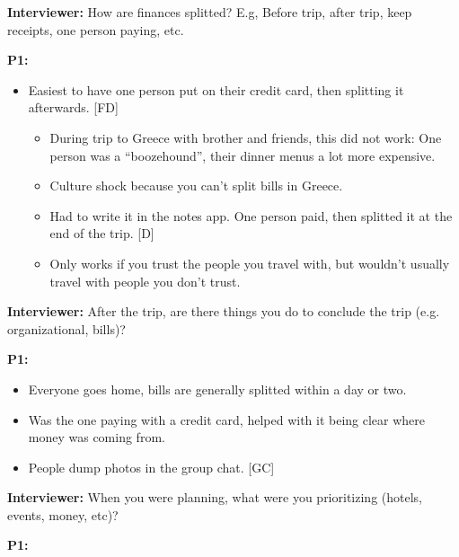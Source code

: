 \documentclass[12pt,a4paper]{article}
\begin{document}
\textbf{Interviewer:} How are finances splitted? E.g, Before trip, after trip, keep receipts, one person paying, etc.

\textbf{P1:}

\begin{itemize}
    \item Easiest to have one person put on their credit card, then splitting it afterwards. [FD]
    \begin{itemize}
        \item During trip to Greece with brother and friends, this did not work:
One person was a “boozehound”, their dinner menus a lot more expensive. 

        \item Culture shock because you can’t split bills in Greece. 
        \item Had to write it in the notes app. One person paid, then splitted it at the end of the trip. [D]
        \item Only works if you trust the people you travel with, but wouldn’t usually travel with people you don’t trust. 
    \end{itemize}
\end{itemize}

\textbf{Interviewer:} After the trip, are there things you do to conclude the trip (e.g. organizational, bills)?

\textbf{P1:}

\begin{itemize}
    \item Everyone goes home, bills are generally splitted within a day or two. 
    \item Was the one paying with a credit card, helped with it being clear where money was coming from. 
    \item People dump photos in the group chat. [GC]
\end{itemize}

\textbf{Interviewer:} When you were planning, what were you prioritizing (hotels, events, money, etc)?

\textbf{P1:}
\end{document}
